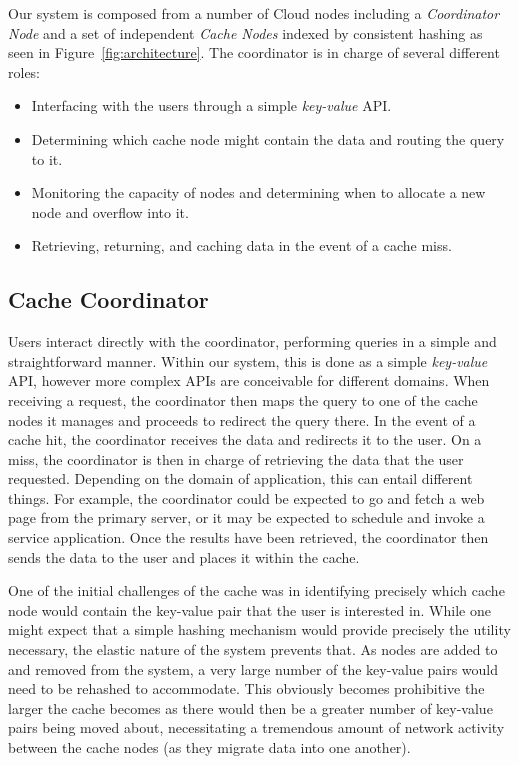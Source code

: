 Our system is composed from a number of Cloud nodes including a
\emph{Coordinator Node} and a set of independent \emph{Cache Nodes} indexed by
consistent hashing as seen in Figure~\ref{fig:architecture}. The coordinator is
in charge of several different roles:
\begin{itemize}
  \item Interfacing with the users through a simple \emph{key-value} API.
	\item Determining which cache node might contain the data and routing the
		query to it.
	\item Monitoring the capacity of nodes and determining when to allocate a new
		node and overflow into it.
	\item Retrieving, returning, and caching data in the event of a cache miss.
\end{itemize}

\subsection{Cache Coordinator} %
\label{sec:Cache_Coordinator}
Users interact directly with the coordinator, performing queries in a simple
and straightforward manner. Within our system, this is done as a simple
\emph{key-value} API, however more complex APIs are conceivable for different
domains.  When receiving a request, the coordinator then maps the query to one
of the cache nodes it manages and proceeds to redirect the query there. In the
event of a cache hit, the coordinator receives the data and redirects it to the
user.  On a miss, the coordinator is then in charge of retrieving the data that
the user requested. Depending on the domain of application, this can entail
different things. For example, the coordinator could be expected to go and
fetch a web page from the primary server, or it may be expected to schedule and
invoke a service application. Once the results have been retrieved, the
coordinator then sends the data to the user and places it within the cache.

One of the initial challenges of the cache was in identifying precisely which
cache node would contain the key-value pair that the user is interested in.
While one might expect that a simple hashing mechanism would provide precisely
the utility necessary, the elastic nature of the system prevents that. As nodes
are added to and removed from the system, a very large number of the key-value
pairs would need to be rehashed to accommodate. This obviously becomes
prohibitive the larger the cache becomes as there would then be a greater
number of key-value pairs being moved about, necessitating a tremendous amount
of network activity between the cache nodes (as they migrate data into one
another).


